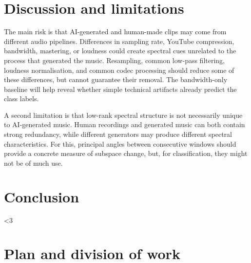 \documentclass[11pt,a4paper]{article}
\newcommand{\stage}{1}
\newif\ifshowguide
\theoremstyle{plain}
\theoremstyle{definition}
\theoremstyle{remark}
\newcommand{\guide}[1]{\ifshowguide\par\smallskip\noindent
  \colorbox{gray!12}{\parbox{\dimexpr\linewidth-2\fboxsep}{\small\itshape
  \textbf{Guidance.} #1}}\par\smallskip\fi}
\newcommand{\bodyend}{\label{body-end}}
\begin{document}
\section{Discussion and limitations}
\label{sec:discussion}

The main risk is that AI-generated and human-made clips may come
from different audio pipelines. Differences in sampling rate,
YouTube compression, bandwidth, mastering, or loudness could create
spectral cues unrelated to the process that generated the music.
Resampling, common low-pass filtering, loudness normalisation, and
common codec processing should reduce some of these differences,
but cannot guarantee their removal. The bandwidth-only baseline
will help reveal whether simple technical artifacts already
predict the class labels.

A second limitation is that low-rank spectral structure is not
necessarily unique to AI-generated music. Human recordings and
generated music can both contain strong redundancy, while different
generators may produce different spectral characteristics.
For this, principal angles between consecutive windows should provide
a concrete measure of subspace change,
but, for classification, they might not be of much use.

\section{Conclusion}
\label{sec:conclusion}

\guide{What you achieved, the main difficulties, and what you would do
next. Half a page is enough.}

\ifnum\stage<3
\section{Plan and division of work}
\label{sec:plan}

\guide{Interim reports only; this section disappears from the final
report. \emph{Interim report 1}: the planned steps and who does what.
\emph{Interim report 2}: what is not working yet, any change of plan,
and the outline of the final report.}
\fi

\bodyend
\end{document}
